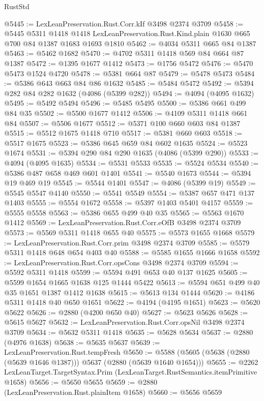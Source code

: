 \begin{lexlean}{RustStd}
\begin{coremodule}
@5445 := LexLeanPreservation.Rust.Corr.kIf @3498 @2374 @3709
@5458 := @5445
    @5311
    @1418
    @1418
    LexLeanPreservation.Rust.Kind.plain
    @1630
    @665
    @700
    @84
    @1387
    @1683
    @1693
    @1810
@5462 := @4034 @5311 @665 @84 @1387
@5463 := @5462 @1682
@5470 := @4702 @5311 @1418 @569 @84 @664 @87 @1387
@5472 := @1395 @1677 @1412
@5473 := @1756 @5472
@5476 := @5470 @5473 @1524 @4720
@5478 := @5381 @664 @87
@5479 := @5478 @5473
@5484 := @5386 @643 @663 @84 @86 @1632
@5485 := @5484 @5472
@5492 := @5394 @282 @84 @282 @1632 (@4086 (@5399 @282))
@5494 := @4094 (@4095 @1632)
@5495 := @5492 @5494
@5496 := @5485 @5495
@5500 := @5386 @661 @499 @84 @35
@5502 := @5500 @1677 @1412
@5506 := @4109 @5311 @1418 @661 @84
@5507 := @5506 @1677
@5512 := @5371 @100 @660 @603 @84 @1387
@5515 := @5512 @1675 @1418 @710
@5517 := @5381 @660 @603
@5518 := @5517 @1675
@5523 := @5386 @645 @659 @84 @602 @1635
@5524 := @5523 @1674
@5531 := @5394 @290 @84 @290 @1635 (@4086 (@5399 @290))
@5533 := @4094 (@4095 @1635)
@5534 := @5531 @5533
@5535 := @5524 @5534
@5540 := @5386 @487 @658 @469 @601 @1401
@5541 := @5540 @1673
@5544 := @5394 @19 @469 @19
@5545 := @5544 @1401
@5547 := @4086 (@5399 @19)
@5549 := @5545 @5547 @4140
@5550 := @5541 @5549
@5554 := @5387 @657 @471 @137 @1403
@5555 := @5554 @1672
@5558 := @5397 @1403 @5401 @4157
@5559 := @5555 @5558
@5563 := @5386 @655 @499 @40 @35
@5565 := @5563 @1670 @1412
@5569 := LexLeanPreservation.Rust.Corr.eOfB @3498 @2374 @3709
@5573 := @5569 @5311 @1418 @655 @40
@5575 := @5573 @1655 @1668
@5579 := LexLeanPreservation.Rust.Corr.prim @3498 @2374 @3709
@5585 := @5579 @5311 @1418 @648 @654 @403 @40
@5588 := @5585 @1655 @1666 @1658
@5592 := LexLeanPreservation.Rust.Corr.opsCons @3498 @2374 @3709
@5594 := @5592 @5311 @1418
@5599 := @5594 @491 @653 @40 @137 @1625
@5605 := @5599 @1654 @1665 @1638 @125 @1444 @5422
@5613 := @5594 @651 @499 @40 @35 @1651 @1387 @1412 @1638
@5615 := @5613 @134 @1444
@5620 := @4186 @5311 @1418 @40 @650 @1651
@5622 := @4194 (@4195 @1651)
@5623 := @5620 @5622
@5626 := @2880 (@4200 @650 @40)
@5627 := @5623 @5626
@5628 := @5615 @5627
@5632 := LexLeanPreservation.Rust.Corr.opsNil @3498 @2374 @3709
@5634 := @5632 @5311 @1418
@5635 := @5628 @5634
@5637 := @2880 (@4976 @1638)
@5638 := @5635 @5637
@5639 := LexLeanPreservation.Rust.tempFresh
@5650 := @5588 (@5605 (@5638 (@2880 (@5639 @1646 @1387))) @5637 (@2880 (@5639 @1640 @1654)))
@5655 := @2262 LexLeanTarget.TargetSyntax.Prim (LexLeanTarget.RustSemantics.itemPrimitive @1658)
@5656 := @5650 @5655
@5659 := @2880 (LexLeanPreservation.Rust.plainItem @1658)
@5660 := @5656 @5659

\end{coremodule}
\end{lexlean}
